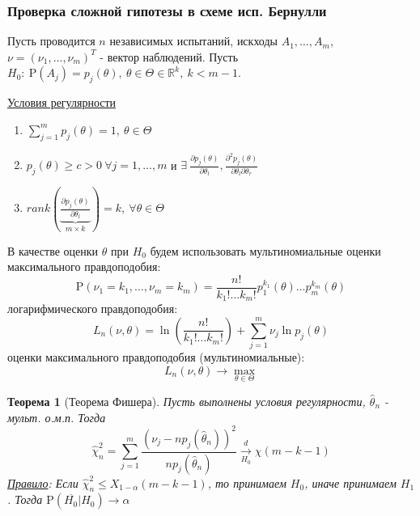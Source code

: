 \documentclass[12pt]{article}
\theoremstyle{basic_theorem}
\theoremstyle{name_theorem}
\newtheorem*{named_theorem}{Теорема}
\def\R{ \mathbb{R} }
\def\P{ \mathrm{P} }
\begin{document}
\subsubsection*{Проверка сложной гипотезы в схеме исп. Бернулли}
    Пусть проводится $n$ независимых испытаний, искходы
    $A_1,\ldots,A_m$, $\nu=(\nu_1,\ldots,\nu_m)^T$ - вектор наблюдений.
    Пусть $H_0:\ \P(A_j)=p_j(\theta),\ \theta\in\Theta\in\R^k,\ k<m-1$.

    \underline{Условия регулярности}
    \begin{enumerate}
        \item $\sum_{j=1}^mp_j(\theta)=1,\ \theta\in\Theta$
        \item $p_j(\theta)\geq c>0\ \forall j=1,\ldots,m$ и $\exists\ \frac{\partial p_j(\theta)}{\partial \theta_l},\frac{\partial^2p_j(\theta)}{\partial\theta_l\partial\theta_r}$
        \item $rank(\underbrace{\frac{\partial p_j(\theta)}{\partial \theta_l}}_{\text{$m\times k$}})=k,\ \forall\theta\in\Theta$
    \end{enumerate}
    В качестве оценки $\theta$ при $H_0$ будем использовать мультиномиальные
    оценки максимального правдоподобия:
    \[\P(\nu_1=k_1,\ldots,\nu_m=k_m)=\frac{n!}{k_1!\ldots k_m!}p_1^{k_1}(\theta)\ldots p_m^{k_m}(\theta)\]
    логарифмического правдоподобия:
    \[L_n(\nu,\theta)=\ln\left(\frac{n!}{k_1!\ldots k_m!}\right)+\sum_{j=1}^m\nu_j\ln p_j(\theta)\]
    оценки максимального правдоподобия (мультиномиальные):
    \[L_n(\nu,\theta)\rightarrow\max_{\theta\in\Theta}\]
    \begin{named_theorem}[Теорема Фишера]
        Пусть выполнены условия регулярности, $\widehat{\theta}_n$ - мульт. о.м.п. Тогда
        \[\widehat{\chi}_n^2=\sum_{j=1}^m\frac{(\nu_j-np_j(\widehat{\theta}_n))^2}{np_j(\widehat{\theta}_n)}\xrightarrow[H_0]{d}\chi(m-k-1)\]
        \underline{Правило}: Если $\widehat{\chi}_n^2\leq X_{1-\alpha}(m-k-1)$, то принимаем $H_0$, иначе принимаем $H_1$.
        Тогда $\P(\overline{H_0}\vert H_0)\rightarrow\alpha$
    \end{named_theorem}
\end{document}
